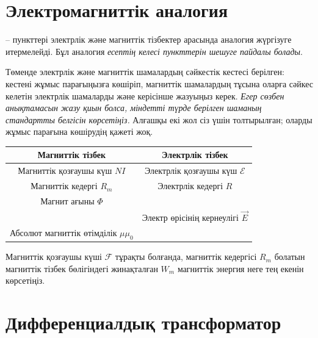 \part{Электромагниттік аналогия}

-- пункттері электрлік және магниттік тізбектер арасында аналогия жүргізуге итермелейді. Бұл аналогия \textit{есептің келесі пункттерін шешуге пайдалы болады}.

\begin{task}
    \item Төменде электрлік және магниттік шамалардың сәйкестік кестесі берілген: кестені жұмыс парағыңызға көшіріп, магниттік шамалардың тұсына оларға сәйкес келетін электрлік шамаларды және керісінше жазуыңыз керек. \textit{Егер сөзбен анықтамасын жазу қиын болса, міндетті түрде берілген шаманың стандартты белгісін көрсетіңіз.} Алғашқы екі жол сіз үшін толтырылған; оларды жұмыс парағына көшірудің қажеті жоқ.
    \begin{center}
    \begin{tabular}{|c|c|}\hline
         \textbf{Магниттік тізбек}& \textbf{Электрлік тізбек} \\\hline
         Магниттік қозғаушы күш $NI$& Электрлік қозғаушы күш $\mathcal E$\\\hline
         Магниттік кедергі $R_m$& Электрлік кедергі $R$\\\hline
         Магнит ағыны $\Phi$ &\\\hline
         &Электр өрісінің кернеулігі $\vec E$ \\\hline
         Абсолют магниттік өтімділік $\mu\mu_0$&\\\hline
    \end{tabular}
    \end{center}
    
    \item Магниттік қозғаушы күші $\mathcal F$ тұрақты болғанда, магниттік кедергісі $R_m$ болатын магниттік тізбек бөлігіндегі жинақталған $W_m$ магниттік энергия неге тең екенін көрсетіңіз.
\end{task}

\part{Дифференциалдық трансформатор}

